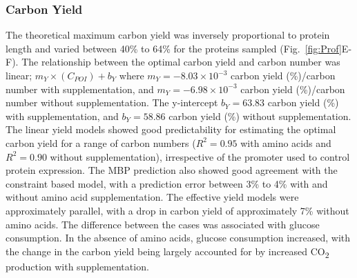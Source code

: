 \documentclass[journal=asbcd6,manuscript=article]{achemso}
\begin{document}

\subsubsection{Carbon Yield}
The theoretical maximum carbon yield was inversely proportional to protein length and varied between 40\% to 64\% for the proteins sampled (Fig.~\ref{fig:Prof}E-F).
The relationship between the optimal carbon yield and carbon number was linear; $m_{Y}\times(C_{POI})+b_{Y}$ where $m_{Y} =  -8.03\times10^{-3}$ carbon yield (\%)/carbon number with supplementation, and $m_{Y} = -6.98\times10^{-3}$ carbon yield (\%)/carbon number  without supplementation.
The y-intercept $b_{Y} = 63.83$ carbon yield (\%) with supplementation, and $b_{Y} = 58.86$ carbon yield (\%) without supplementation.
The linear yield models showed good predictability for estimating the optimal carbon yield for a range of carbon numbers ($R^{2} = 0.95$ with amino acids
and $R^{2} = 0.90$ without supplementation), irrespective of the promoter used to control protein expression.
The MBP prediction also showed good agreement with the constraint based model, with a prediction error between 3\% to 4\% with and without amino acid supplementation.
The effective yield models were approximately parallel, with a drop in carbon yield of approximately 7\% without amino acids.
The difference between the cases was associated with glucose consumption.
In the absence of amino acids, glucose consumption increased, with the change in the carbon yield being
largely accounted for by increased CO\textsubscript{2} production with supplementation.
\end{document}
